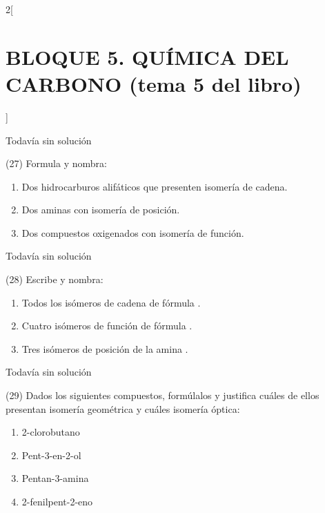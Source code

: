 \documentclass[10pt]{article}
\begin{document}
\begin{multicols}{2}[
  \section{BLOQUE 5. QUÍMICA DEL CARBONO (tema 5 del libro)}
  ]
\begin{solution}[print=false]
  Todavía sin solución
\end{solution}




\begin{exercise}[
    tags    = {},
    topics  = {química, química orgánica, orgánica},
    source  = {FQ 1B MGH 2016, p143, e27},
  ]
  (27) Formula y nombra:
  \begin{enumerate}
    \item Dos hidrocarburos alifáticos que presenten isomería de cadena.
    \item Dos aminas con isomería de posición.
    \item Dos compuestos oxigenados con isomería de función.
  \end{enumerate}
\end{exercise}

\begin{solution}[print=false]
  Todavía sin solución
\end{solution}




\begin{exercise}[
    tags    = {},
    topics  = {química, química orgánica, orgánica},
    source  = {FQ 1B MGH 2016, p143, e28},
  ]
  (28) Escribe y nombra:
  \begin{enumerate}
    \item Todos los isómeros de cadena de fórmula .
    \item Cuatro isómeros de función de fórmula .
    \item Tres isómeros de posición de la amina .
  \end{enumerate}
\end{exercise}

\begin{solution}[print=false]
  Todavía sin solución
\end{solution}




\begin{exercise}[
    tags    = {},
    topics  = {química, química orgánica, orgánica},
    source  = {FQ 1B MGH 2016, p143, e29},
  ]
  (29) Dados los siguientes compuestos, formúlalos y justifica cuáles
  de ellos presentan isomería geométrica y cuáles isomería
  óptica:
  \begin{enumerate}
    \item 2-clorobutano
    \item Pent-3-en-2-ol
    \item Pentan-3-amina
    \item 2-fenilpent-2-eno
  \end{enumerate}
\end{exercise}


\end{multicols}
\end{document}
